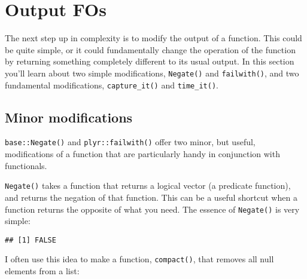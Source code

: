 \hypertarget{output-fos}{%
\section{Output FOs}\label{output-fos}}

The next step up in complexity is to modify the output of a function.
This could be quite simple, or it could fundamentally change the
operation of the function by returning something completely different to
its usual output. In this section you'll learn about two simple
modifications, \texttt{Negate()} and \texttt{failwith()}, and two
fundamental modifications, \texttt{capture\_it()} and
\texttt{time\_it()}.

\hypertarget{minor-modifications}{%
\subsection{Minor modifications}\label{minor-modifications}}

\texttt{base::Negate()} and \texttt{plyr::failwith()} offer two minor,
but useful, modifications of a function that are particularly handy in
conjunction with functionals.  

\texttt{Negate()} takes a function that returns a logical vector (a
predicate function), and returns the negation of that function. This can
be a useful shortcut when a function returns the opposite of what you
need. The essence of \texttt{Negate()} is very simple:

\begin{Shaded}
\begin{Highlighting}[]
\StringTok{ }
  \OperatorTok{!}
\NormalTok{\}}
\NormalTok{(}\NormalTok{)}
\end{Highlighting}
\end{Shaded}

\begin{verbatim}
## [1] FALSE
\end{verbatim}

I often use this idea to make a function, \texttt{compact()}, that
removes all null elements from a list: 

\begin{Shaded}
\begin{Highlighting}[]
\StringTok{ }\NormalTok{(}
\end{Highlighting}
\end{Shaded}

